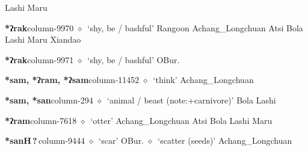          Lashi 
\hspace{1ex}
         Maru 
  \item {\footnotesize \textbf{*ʔrak}}{\tiny column-9970}
         $\diamond$~`shy, be / bashful'
         Rangoon 
\hspace{1ex}
         Achang\_Longchuan 
\hspace{1ex}
         Atsi 
\hspace{1ex}
         Bola 
\hspace{1ex}
         Lashi 
\hspace{1ex}
         Maru 
\hspace{1ex}
         Xiandao 
  \item {\footnotesize \textbf{*ʔrak}}{\tiny column-9971}
         $\diamond$~`shy, be / bashful'
         OBur. 
  \item {\footnotesize \textbf{*sam, *ʔram, *ʔsam}}{\tiny column-11452}
         $\diamond$~`think'
         Achang\_Longchuan 
  \item {\footnotesize \textbf{*sam, *san}}{\tiny column-294}
         $\diamond$~`animal / beast (note:+carnivore)'
         Bola 
\hspace{1ex}
         Lashi 
  \item {\footnotesize \textbf{*ʔram}}{\tiny column-7618}
         $\diamond$~`otter'
         Achang\_Longchuan 
\hspace{1ex}
         Atsi 
\hspace{1ex}
         Bola 
\hspace{1ex}
         Lashi 
\hspace{1ex}
         Maru 
  \item {\footnotesize \textbf{*sanH\,?\,}}{\tiny column-9444}
         $\diamond$~`scar'
         OBur. 
\hspace{1ex}
         $\diamond$~`scatter (seeds)'
         Achang\_Longchuan 
